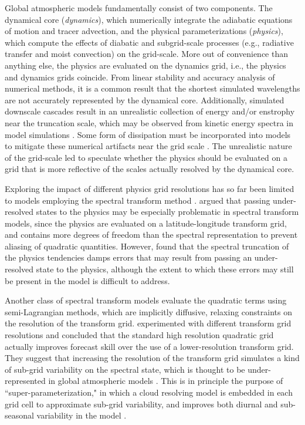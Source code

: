 \documentclass[draft,linenumbers]{agujournal}
\begin{document}
Global atmospheric models fundamentally consist of two components. The dynamical core ({\em{dynamics}}), which numerically integrate the adiabatic equations of motion and tracer advection, and the physical parameterizations ({\em{physics}}), which compute the effects of diabatic and subgrid-scale processes (e.g., radiative transfer and moist convection) on the grid-scale. More out of convenience than anything else, the physics are evaluated on the dynamics grid, i.e., the physics and dynamics grids coincide. From linear stability and accuracy analysis of numerical methods, it is a common result that the shortest simulated wavelengths are not accurately represented by the dynamical core. Additionally, simulated downscale cascades result in an unrealistic collection of energy and/or enstrophy near the truncation scale, which may be observed from kinetic energy spectra in model simulations \citep{S2011LNCSE}. Some form of dissipation must be incorporated into models to mitigate these numerical artifacts near the grid scale \citep{JW2010LNCSE}. The unrealistic nature of the grid-scale led \cite{LH1997MWR} to speculate whether the physics should be evaluated on a grid that is more reflective of the scales actually resolved by the dynamical core.

Exploring the impact of different physics grid resolutions has so far been limited to models employing the spectral transform method \citep{LH1997MWR,W1999T,W2014PTRSL}. \cite{LH1997MWR} argued that passing under-resolved states to the physics may be especially problematic in spectral transform models, since the physics are evaluated on a latitude-longitude transform grid, and contains more degrees of freedom than the spectral representation to prevent aliasing of quadratic quantities. However, \cite{LH1997MWR} found that the spectral truncation of the physics tendencies damps errors that may result from passing an under-resolved state to the physics, although the extent to which these errors may still be present in the model is difficult to address. 

Another class of spectral transform models evaluate the quadratic terms using semi-Lagrangian methods, which are implicitly diffusive, relaxing constraints on the resolution of the transform grid. \cite{W2014PTRSL} experimented with different transform grid resolutions and concluded that the standard high resolution quadratic grid actually improves forecast skill over the use of a lower-resolution transform grid. They suggest that increasing the resolution of the transform grid simulates a kind of sub-grid variability on the spectral state, which is thought to be under-represented in global atmospheric models \citep{S2005QJR}. This is in principle the purpose of ``super-parameterization," in which a cloud resolving model is embedded in each grid cell to approximate sub-grid variability, and improves both diurnal and sub-seasonal variability in the model \citep{RKAG2003BAMS}.
\end{document}
